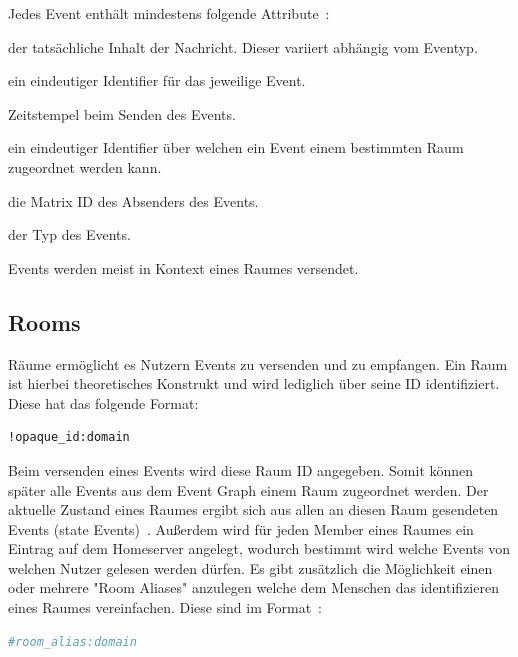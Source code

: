     Jedes Event enthält mindestens folgende Attribute~\cite{eventformat}:
    \begin{description}[leftmargin=!,labelwidth=3.5cm]
        \item [content] der tatsächliche Inhalt der Nachricht. Dieser variiert abhängig vom Eventyp.
        \item [event\_id] ein eindeutiger Identifier für das jeweilige Event.
        \item [origin\_server\_ts] Zeitstempel beim Senden des Events.
        \item [room\_id] ein eindeutiger Identifier über welchen ein Event einem bestimmten Raum zugeordnet werden kann.
        \item [sender] die Matrix ID des Absenders des Events.
        \item [type] der Typ des Events.
    \end{description}

    Events werden meist in Kontext eines Raumes versendet.

    \newpage
    \subsection{Rooms}\label{subsec:rooms}
    Räume ermöglicht es Nutzern Events zu versenden und zu empfangen.
    Ein Raum ist hierbei theoretisches Konstrukt und wird lediglich über seine ID identifiziert.
    Diese hat das folgende Format:
    \begin{lstlisting}[language=bash,label={lst:roomid}]
        !opaque_id:domain
    \end{lstlisting}
    Beim versenden eines Events wird diese Raum ID angegeben.
    Somit können später alle Events aus dem Event Graph einem Raum zugeordnet werden.
    Der aktuelle Zustand eines Raumes ergibt sich aus allen an diesen Raum gesendeten Events (state Events)~\cite{rooms}.
    Außerdem wird für jeden Member eines Raumes ein Eintrag auf dem Homeserver angelegt, wodurch bestimmt wird welche Events von welchen Nutzer gelesen werden dürfen.
    Es gibt zusätzlich die Möglichkeit einen oder mehrere "Room Aliases" anzulegen welche dem Menschen das identifizieren eines Raumes vereinfachen.
    Diese sind im Format~\cite{rooms}:
    \begin{lstlisting}[language=bash,label={lst:roomalias}]
        #room_alias:domain
    \end{lstlisting}



